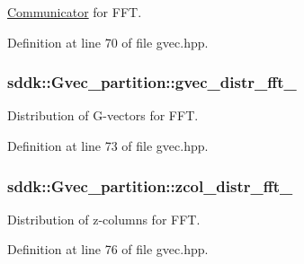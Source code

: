 \hyperlink{classsddk_1_1_communicator}{Communicator} for F\+F\+T. 



Definition at line 70 of file gvec.\+hpp.

\hypertarget{classsddk_1_1_gvec__partition_ac2992a89220c7828c436c2d9e1d1ace1}{}
\subsubsection[{gvec\+\_\+distr\+\_\+fft\+\_\+}]{ sddk\+::\+Gvec\+\_\+partition\+::gvec\+\_\+distr\+\_\+fft\+\_\+\hspace{0.3cm}{\ttfamily [private]}}\label{classsddk_1_1_gvec__partition_ac2992a89220c7828c436c2d9e1d1ace1}


Distribution of G-\/vectors for F\+F\+T. 



Definition at line 73 of file gvec.\+hpp.

\hypertarget{classsddk_1_1_gvec__partition_af5116728e1f4b99087fc58aaaeb7624b}{}
\subsubsection[{zcol\+\_\+distr\+\_\+fft\+\_\+}]{ sddk\+::\+Gvec\+\_\+partition\+::zcol\+\_\+distr\+\_\+fft\+\_\+\hspace{0.3cm}{\ttfamily [private]}}\label{classsddk_1_1_gvec__partition_af5116728e1f4b99087fc58aaaeb7624b}


Distribution of z-\/columns for F\+F\+T. 



Definition at line 76 of file gvec.\+hpp.

\hypertarget{classsddk_1_1_gvec__partition_a1bbdc7cf03e46984293f7b25e7aedd81}{}
